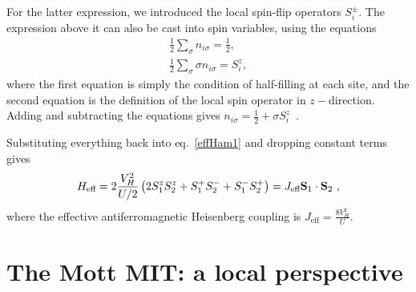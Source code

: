 \documentclass[reprint,hidelinks,onecolumn]{revtex4-2}
\begin{document}
For the latter expression, we introduced the local spin-flip operators \(S_i^\pm\). The expression above it can also be cast into spin variables, using the equations
\begin{equation}\begin{aligned}
	\frac{1}{2}\sum_{\sigma}n_{i\sigma} = \frac{1}{2},\\
    \frac{1}{2}\sum_{\sigma}\sigma n_{i\sigma} = S_i^z,
\end{aligned}\end{equation}
where the first equation is simply the condition of half-filling at each site, and the second equation is the definition of the local spin operator in \(z-\)direction. Adding and subtracting the equations gives \(n_{i\sigma} = \frac{1}{2} + \sigma S_i^z\)~.

Substituting everything back into eq.~\ref{effHam1} and dropping constant terms gives
\begin{equation}\begin{aligned}
	H_\text{eff} = 2\frac{V_H^2}{U/2}\left(2S_1^z S_2^z + S_1^+S_2^- + S_1^-S_2^+\right) = J_\text{eff} {\bf S}_1\cdot{\bf S}_2~,
\end{aligned}\end{equation}
where the effective antiferromagnetic Heisenberg coupling is \(J_\text{eff} = \frac{8V_H^2}{U}\).







\clearpage



\section{The Mott MIT: a local perspective}
\end{document}
